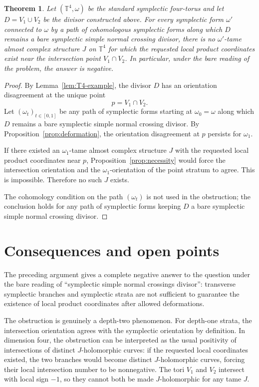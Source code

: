\documentclass[12pt]{article}
\newtheorem{theorem}{Theorem}[section]
\newcommand{\T}{\mathbb T}
\begin{document}
\begin{theorem}\label{thm:main}
Let \((\T^4,\omega)\) be the standard symplectic four-torus and let \(D=V_1\cup V_2\) be the divisor constructed above. For every symplectic form \(\omega'\) connected to \(\omega\) by a path of cohomologous symplectic forms along which \(D\) remains a bare symplectic simple normal crossing divisor, there is no \(\omega'\)-tame almost complex structure \(J\) on \(\T^4\) for which the requested local product coordinates exist near the intersection point \(V_1\cap V_2\). In particular, under the bare reading of the problem, the answer is negative.
\end{theorem}

\begin{proof}
By Lemma~\ref{lem:T4-example}, the divisor \(D\) has an orientation disagreement at the unique point
\[
p=V_1\cap V_2.
\]
Let \((\omega_t)_{t\in[0,1]}\) be any path of symplectic forms starting at \(\omega_0=\omega\) along which \(D\) remains a bare symplectic simple normal crossing divisor. By Proposition~\ref{prop:deformation}, the orientation disagreement at \(p\) persists for \(\omega_1\).

If there existed an \(\omega_1\)-tame almost complex structure \(J\) with the requested local product coordinates near \(p\), Proposition~\ref{prop:necessity} would force the intersection orientation and the \(\omega_1\)-orientation of the point stratum to agree. This is impossible. Therefore no such \(J\) exists.

The cohomology condition on the path \((\omega_t)\) is not used in the obstruction; the conclusion holds for any path of symplectic forms keeping \(D\) a bare symplectic simple normal crossing divisor.
\end{proof}

\section{Consequences and open points}

The preceding argument gives a complete negative answer to the question under the bare reading of ``symplectic simple normal crossings divisor'': transverse symplectic branches and symplectic strata are not sufficient to guarantee the existence of local product coordinates after allowed deformations.

The obstruction is genuinely a depth-two phenomenon. For depth-one strata, the intersection orientation agrees with the symplectic orientation by definition. In dimension four, the obstruction can be interpreted as the usual positivity of intersections of distinct \(J\)-holomorphic curves: if the requested local coordinates existed, the two branches would become distinct \(J\)-holomorphic curves, forcing their local intersection number to be nonnegative. The tori \(V_1\) and \(V_2\) intersect with local sign \(-1\), so they cannot both be made \(J\)-holomorphic for any tame \(J\).
\end{document}
